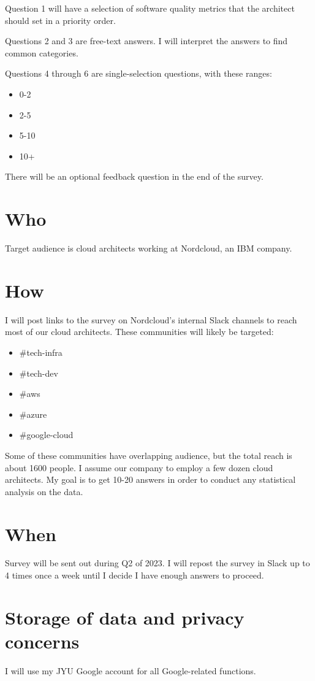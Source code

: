 \documentclass[utf8,english]{gradu3}
\begin{document}
Question 1 will have a selection of software quality metrics that the architect should set in a priority order.

Questions 2 and 3 are free-text answers.
I will interpret the answers to find common categories.

Questions 4 through 6 are single-selection questions, with these ranges:
\begin{itemize}
  \item 0-2
  \item 2-5
  \item 5-10
  \item 10+
\end{itemize}

There will be an optional feedback question in the end of the survey.

\section{Who}

Target audience is cloud architects working at Nordcloud, an IBM company.

\section{How}
I will post links to the survey on Nordcloud's internal Slack channels to reach
most of our cloud architects.
These communities will likely be targeted:
\begin{itemize}
  \item \#tech-infra
  \item \#tech-dev
  \item \#aws
  \item \#azure
  \item \#google-cloud
\end{itemize}

Some of these communities have overlapping audience, but the total reach is about 1600 people.
I assume our company to employ a few dozen cloud architects.
My goal is to get 10-20 answers in order to conduct any statistical analysis on
the data.

\section{When}
Survey will be sent out during Q2 of 2023.
I will repost the survey in Slack up to 4 times once a week until I decide I
have enough answers to proceed.

\section{Storage of data and privacy concerns}
I will use my JYU Google account for all Google-related functions.
\end{document}
